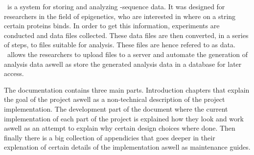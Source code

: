 \appName\ is a system for storing and analyzing -sequence data. It was designed for researchers in the field of epigenetics, who are interested in where on a  string certain proteins binds. In order to get this information, experiments are conducted and  data files collected. These data files are then converted, in a series of steps, to files suitable for analysis. These files are hence refered to as  data. \appName\ allows the researchers to upload  files to a server and automate the generation of analysis data aswell as store the generated analysis data in a database for later access. 

The documentation contains three main parts. Introduction chapters that explain the goal of the project aswell as a non-technical description of the project implementation. The development part of the document where the current implementation of each part of the project is explained how they look and work aswell as an attempt to explain why certain design choices where done. Then finally there is a big collection of appendicies that goes deeper in their explenation of certain details of the implementation aswell as maintenance guides.

